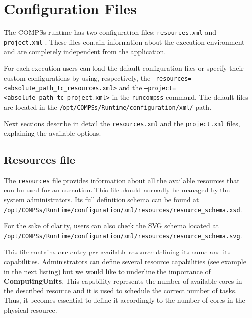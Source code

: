 \section{Configuration Files}
\label{sec:configuration_files}

The COMPSs runtime has two configuration files: \texttt{resources.xml} and \texttt{project.xml} .
These files contain information about the execution environment and are completely independent from the application.

For each execution users can load the default configuration files or specify their custom configurations
by using, respectively, the \texttt{--resources=<absolute\_path\_to\_resources.xml>} and the
\texttt{--project=<absolute\_path\_to\_project.xml>} in the \texttt{runcompss} command. The default files are located
in the \texttt{/opt/COMPSs/Runtime/configuration/xml/} path.

Next sections describe in detail the \texttt{resources.xml} and the \texttt{project.xml} files,
explaining the available options.

\subsection{Resources file}
The \texttt{resources} file provides information about all the available resources that can be used for an execution.
This file should normally be managed by the system administrators. Its full definition schema can be found at \\
\texttt{/opt/COMPSs/Runtime/configuration/xml/resources/resource\_schema.xsd}.

For the sake of clarity, users can also check the SVG schema located at \\
\texttt{/opt/COMPSs/Runtime/configuration/xml/resources/resource\_schema.svg}.

This file contains one entry per available resource defining its name and its capabilities. Administrators can define several
resource capabilities (see example in the next listing) but we would like to underline the importance of
\textbf{ComputingUnits}. This capability represents the number of available cores in the described resource and it is
used to schedule the correct number of tasks. Thus, it becomes essential to define it accordingly to the number of cores
in the physical resource.

